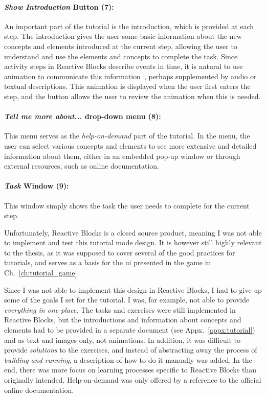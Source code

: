 \paragraph{\emph{Show Introduction} Button (7):} An important part of the tutorial is the introduction, which is provided at each step. The introduction gives the user some basic information about the new concepts and elements introduced at the current step, allowing the user to understand and use the elements and concepts to complete the task. Since activity steps in Reactive Blocks describe events in time, it is natural to use animation to communicate this information~\cite{morrison:animation}, perhaps supplemented by audio or textual descriptions. This animation is displayed when the user first enters the step, and the button allows the user to review the animation when this is needed.

\paragraph{\emph{Tell me more about...} drop-down menu (8):} This menu serves as the \emph{help-on-demand} part of the tutorial. In the menu, the user can select various concepts and elements to see more extensive and detailed information about them, either in an embedded pop-up window or through external resources, such as online documentation.

\paragraph{\emph{Task} Window (9):} This window simply shows the task the user needs to complete for the current step.

\noindent
Unfortunately, Reactive Blocks is a closed source product, meaning I was not able to implement and test this tutorial mode design. It is however still highly relevant to the thesis, as it was supposed to cover several of the good practices for tutorials, and serves as a basis for the \gls{ui} presented in the game in Ch.~\ref{ch:tutorial_game}.

\noindent
Since I was not able to implement this design in Reactive Blocks, I had to give up some of the goals I set for the tutorial. I was, for example, not able to provide \emph{everything in one place}. The tasks and exercises were still implemented in Reactive Blocks, but the introductions and information about concepts and elements had to be provided in a separate document (see Appx.~\ref{appx:tutorial}) and as text and images only, not animations. In addition, it was difficult to provide \emph{solutions} to the exercises, and instead of abstracting away the process of \emph{building and running}, a description of how to do it manually was added. In the end, there was more focus on learning processes specific to Reactive Blocks than originally intended. Help-on-demand was only offered by a reference to the official online documentation.

